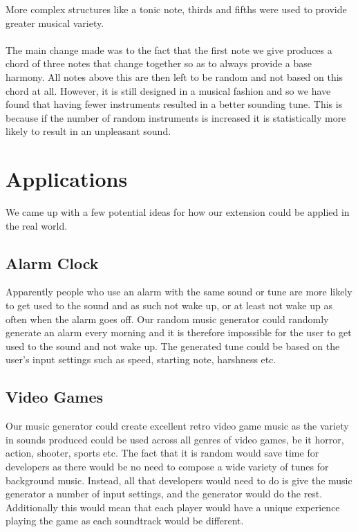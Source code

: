 \documentclass[11pt]{article}
\begin{document}
More complex structures like a tonic note, thirds and fifths were used to provide greater musical variety.
\\\\
The main change made was to the fact that the first note we give produces a chord of three notes that change together so as to always provide a base harmony. All notes above this are then left to be random and not based on this chord at all. However, it is still designed in a musical fashion and so we have found that having fewer instruments resulted in a better sounding tune. This is because if the number of random instruments is increased it is statistically more likely to result in an unpleasant sound.

\section{Applications}
We came up with a few potential ideas for how our extension could be applied in the real world.
\subsection{Alarm Clock}
Apparently people who use an alarm with the same sound or tune are more likely to get used to the sound and as such not wake up, or at least not wake up as often when the alarm goes off. Our random music generator could randomly generate an alarm every morning and it is therefore impossible for the user to get used to the sound and not wake up. The generated tune could be based on the user's input settings such as speed, starting note, harshness etc. 
\subsection{Video Games}
Our music generator could create excellent retro video game music as the variety in sounds produced could be used across all genres of video games, be it horror, action, shooter, sports etc. The fact that it is random would save time for developers as there would be no need to compose a wide variety of tunes for background music. Instead, all that developers would need to do is give the music generator a number of input settings, and the generator would do the rest. Additionally this would mean that each player would have a unique experience playing the game as each soundtrack would be different.
\end{document}
